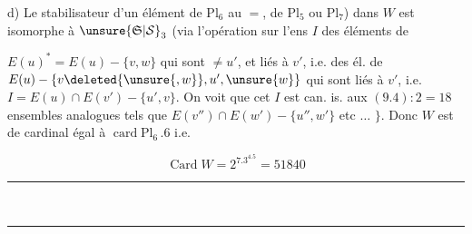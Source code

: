 
d) Le stabilisateur d'un élément de $\mathrm{Pl}_6$   au $=$, de $\mathrm{Pl}_5$ ou $\mathrm{Pl}_7$) dans $W$ est isomorphe à $\unsure{\mathfrak S|\mathcal S}_3$ (via l'opération sur l'ens $I$  des éléments de

 $E(u)^*=E(u)-\{v,w\}$ qui sont $\ne u'$,  et liés à $v'$, i.e. des él. de $E(u)-\{v\deleted{\unsure{,w}},u',\unsure{w}\}$ qui sont liés à $v'$, i.e. $I=E(u)\cap E(v')-\{u',v\}$. On voit  que cet $I$ est can. is. aux $(9.4):2=18$ ensembles analogues tels que $E(v'')\cap E(w')-\{u'',w'\}$ etc $\dots$ $\}$. Donc $W$ est de cardinal égal à $\operatorname{card}\mathrm{Pl}_6\,.6$ \unsure{$\Rightarrow$} i.e.

\[
\operatorname{Card}W=2^7.3^4.5=51840
\]

\begin{center}\rule{1.15cm}{.35pt}\\[-1.2ex]\rule{.95cm}{.35pt}\end{center}

\\
